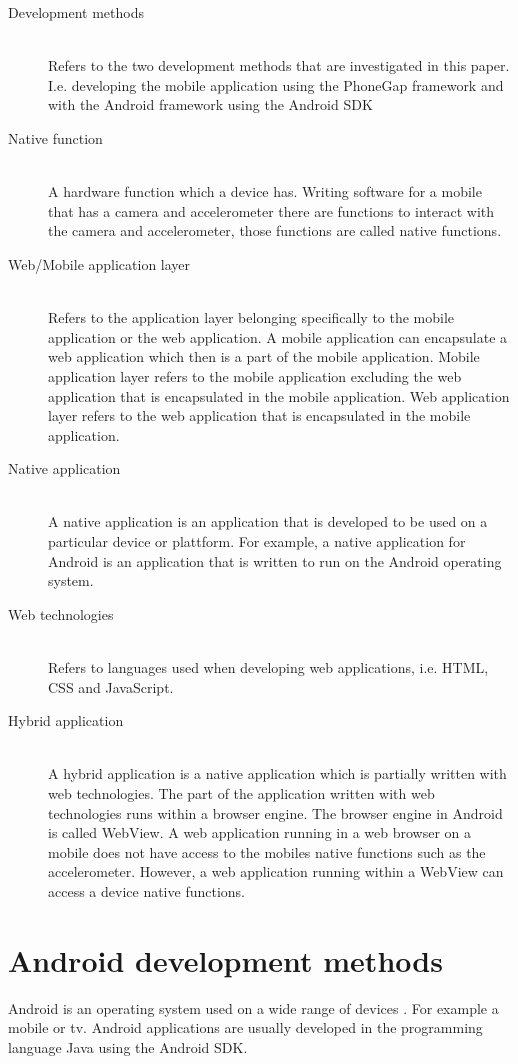 \begin{description}
  \item[Development methods] \hfill \\
    Refers to the two development methods that are investigated in this paper. I.e. developing the mobile application using the PhoneGap framework and with the Android framework using the Android SDK
  \item[Native function] \hfill \\
     A hardware function which a device has. Writing software for a mobile that has a camera and accelerometer there are functions to interact with the camera and accelerometer, those functions are called native functions.
  \item[Web/Mobile application layer] \hfill \\
		Refers to the application layer belonging specifically to the mobile application or the web application. A mobile application can encapsulate a web application which then is a part of the mobile application. Mobile application layer refers to the mobile application excluding the web application that is encapsulated in the mobile application. Web application layer refers to the web application that is encapsulated in the mobile application. 
	\item[Native application] \hfill \\
	A native application is an application that is developed to be used on a particular device or plattform. For example, a native application for Android is an application that is written to run on the Android operating system.
\item[Web technologies] \hfill \\
	Refers to languages used when developing web applications, i.e. HTML, CSS and JavaScript.
\item[Hybrid application] \hfill \\
	A hybrid application is a native application which is partially written with web technologies. The part of the application written with web technologies runs within a browser engine. The browser engine in Android is called WebView. A web application running in a web browser on a mobile does not have access to the mobiles native functions such as the accelerometer. However, a web application running within a WebView can access a device native functions. 
\end{description}

\section{Android development methods}\label{sec:android-development-methods}
Android is an operating system used on a wide range of devices \cite{dell2011}. For example a mobile or tv. Android applications are usually developed in the programming language Java using the Android SDK.

